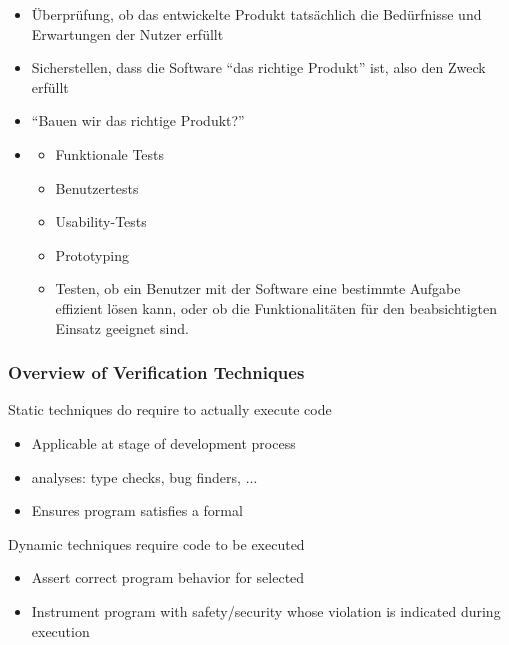 \begin{infoBox}[title=Validation]
    \begin{itemize}
        \item {} Überprüfung, ob das entwickelte Produkt tatsächlich die Bedürfnisse und Erwartungen der Nutzer erfüllt
        \item {} Sicherstellen, dass die Software \enquote{das richtige Produkt} ist, also den Zweck erfüllt
        \item {} \enquote{Bauen wir das richtige Produkt?}
        \item {}
        \begin{itemize}
            \item Funktionale Tests
            \item Benutzertests
            \item Usability-Tests
            \item Prototyping
            \item {} Testen, ob ein Benutzer mit der Software eine bestimmte Aufgabe effizient lösen kann, oder ob die Funktionalitäten für den beabsichtigten Einsatz geeignet sind.
        \end{itemize}
    \end{itemize}
\end{infoBox}
\subsubsection*{Overview of Verification Techniques}
\begin{defBox}[title=Static]
    Static techniques do  require to actually execute code
    \begin{itemize}
        \item {} Applicable at  stage of development process
        \item {}  analyses: type checks, bug finders, ...
        \item {} Ensures program satisfies a formal 
    \end{itemize}
\end{defBox}
\begin{defBox}[title=Dynamic]
    Dynamic techniques  require code to be executed
    \begin{itemize}
        \item {} Assert correct program behavior for selected 
        \item {} Instrument program with safety/security  whose violation is indicated during execution
    \end{itemize}
\end{defBox}
